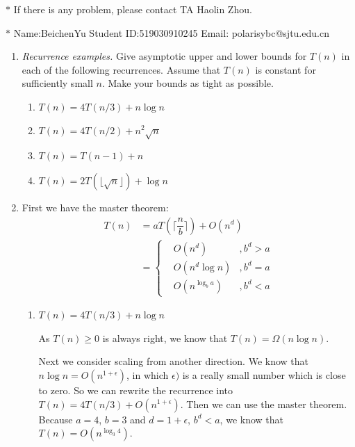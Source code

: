 \documentclass[12pt,a4paper]{article}
\makeatletter
\newtheorem*{solution}{Solution}
\theoremstyle{definition}
\renewenvironment{solution}[1][Solution] {\par\pushQED{\qed}\normalfont\topsep6\p@\@plus6\p@\relax\trivlist\item[\hskip\labelsep\bfseries#1\@addpunct{.}]\ignorespaces}{\popQED\endtrivlist\@endpefalse} \makeatother
\makeatother
\begin{document}
\noindent

\noindent{}
\begin{center}
\footnotesize{\color{red}$*$ If there is any problem, please contact TA Haolin Zhou. }

\footnotesize{\color{blue}$*$ Name:BeichenYu  \quad Student ID:519030910245 \quad Email: polarisybc@sjtu.edu.cn}
\end{center}

\begin{enumerate}
\item
    \textit{Recurrence examples.} Give asymptotic upper and lower bounds for $T(n)$ in each of the following recurrences. Assume that $T(n)$ is constant for sufficiently small $n$. Make your bounds as tight as possible.
\begin{enumerate}
	\item $T(n)=4 T(n / 3)+n \log n$
	\item $T(n)=4 T(n / 2)+n^{2} \sqrt{n}$
	\item $T(n)=T(n-1)+n$	
	\item $T(n)=2T(\lfloor \sqrt n\rfloor)+\log n$
\end{enumerate}

\begin{solution}
    First we have the master theorem:
    \begin{align*}
    T(n)&=aT(\lceil\dfrac{n}{b}\rceil)+O(n^d)\\
    &=\left\{  
\begin{aligned}
&O(n^d)&,b^d>a\\
&O(n^d\log n)&,b^d=a\\
&O(n^{\log_{b} a})&,b^d<a
\end{aligned}
\right.  
    \end{align*}
	\begin{enumerate}
	\item $T(n)=4 T(n / 3)+n \log n$
	
	As $T(n)\geqslant0$ is always right, we know that $T(n) = \Omega(n\log n)$.
	
	Next we consider scaling from another direction. We know that $n\log n = O(n^{1+\epsilon})$, in which $\epsilon)$ is a really small number which is close to zero. So we can rewrite the recurrence into $T(n)=4 T(n / 3)+O(n^{1+\epsilon})$. Then we can use the master theorem. Because $a=4$, $b=3$ and $d=1+\epsilon$, $b^d <a$, we know that $T(n) = O(n^{\log_3 4})$.
	

\end{enumerate}
\end{solution}
\end{enumerate}
\end{document}
